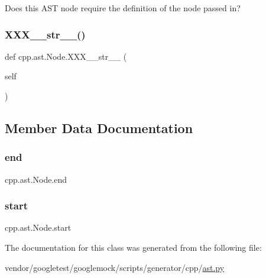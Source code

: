 \begin{DoxyVerb}Does this AST node require the definition of the node passed in?\end{DoxyVerb}
 \mbox{\label{classcpp_1_1ast_1_1_node_ab5dfeabcbcd7c1f5feb8522edffb8b4a}} 
\subsubsection{\texorpdfstring{X\+X\+X\+\_\+\+\_\+str\+\_\+\+\_\+()}{XXX\_\_str\_\_()}}
{\footnotesize\ttfamily def cpp.\+ast.\+Node.\+X\+X\+X\+\_\+\+\_\+str\+\_\+\+\_\+ (\begin{DoxyParamCaption}\item[{}]{self }\end{DoxyParamCaption})}



\subsection{Member Data Documentation}
\mbox{\label{classcpp_1_1ast_1_1_node_a3c5e5246ccf619df28eca02e29d69647}} 
\subsubsection{\texorpdfstring{end}{end}}
{\footnotesize\ttfamily cpp.\+ast.\+Node.\+end}

\mbox{\label{classcpp_1_1ast_1_1_node_a7b2aa97e6a049bb1a93aea48c48f1f44}} 
\subsubsection{\texorpdfstring{start}{start}}
{\footnotesize\ttfamily cpp.\+ast.\+Node.\+start}



The documentation for this class was generated from the following file\+:\begin{DoxyCompactItemize}
\item 
vendor/googletest/googlemock/scripts/generator/cpp/\hyperlink{ast_8py}{ast.\+py}\end{DoxyCompactItemize}
